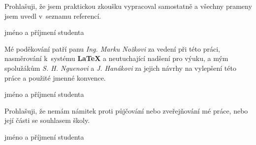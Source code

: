 
\newenvironment{signaturedtext}{\large}{%
	\newline
    \begin{flushright}
		\begin{minipage}[H]{.5\textwidth}
			\begin{center}
				\dotfill\newline
				jméno a příjmení studenta
			\end{center}		
		\end{minipage}
	\end{flushright}
}

\clearpage
\thispagestyle{empty}

\begin{signaturedtext}
	Prohlašuji, že jsem praktickou zkoušku vypracoval samostatně a všechny prameny jsem uvedl v~seznamu referencí.
\end{signaturedtext}

\vspace*{\fill}

\begin{signaturedtext}
	Mé poděkování patří panu \emph{Ing. Marku Nožkovi} za vedení při této práci, nasměrování k~systému \textbf{\LaTeX} a neutuchající nadšení pro výuku, a mým spolužákům \emph{S. H. Nguenovi} a \emph{J. Hanákovi} za jejich návrhy na vylepšení této práce a použité jmenné konvence. 
\end{signaturedtext}
	
\vfill
	
\begin{signaturedtext}
	Prohlašuji, že nemám námitek proti půjčování nebo zveřejňování mé práce, nebo její části se souhlasem školy.
\end{signaturedtext}

\clearpage